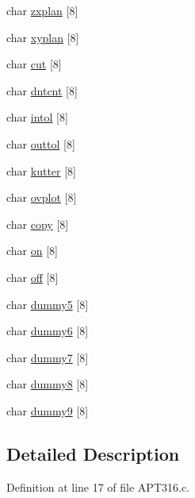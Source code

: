 \begin{DoxyCompactItemize}
char \hyperlink{structholrth__1___aa273c07356670f38ee715d3821a22849}{zxplan} \mbox{[}8\mbox{]}
\item 
char \hyperlink{structholrth__1___a73b0d426f18d0989aa84d7fdab552841}{xyplan} \mbox{[}8\mbox{]}
\item 
char \hyperlink{structholrth__1___a83821b1fc5d105782596df52958257c1}{cut} \mbox{[}8\mbox{]}
\item 
char \hyperlink{structholrth__1___a7f96017a5d84883bb5030d8890abf286}{dntcnt} \mbox{[}8\mbox{]}
\item 
char \hyperlink{structholrth__1___aa4af76563cee6e31925cdc86743662b4}{intol} \mbox{[}8\mbox{]}
\item 
char \hyperlink{structholrth__1___a85d609d0e370f6b88d98799bbdd894e9}{outtol} \mbox{[}8\mbox{]}
\item 
char \hyperlink{structholrth__1___a5ff73d9b6c847252e17e1ff8633b83a3}{kutter} \mbox{[}8\mbox{]}
\item 
char \hyperlink{structholrth__1___a466383973fe32f3731ca50cf4ece72e6}{ovplot} \mbox{[}8\mbox{]}
\item 
char \hyperlink{structholrth__1___ad3a33df9882828132af2cbd01838aaad}{copy} \mbox{[}8\mbox{]}
\item 
char \hyperlink{structholrth__1___a73eb82d2bea5a7eb20511c50a6c14225}{on} \mbox{[}8\mbox{]}
\item 
char \hyperlink{structholrth__1___aaf6a68c43c88c6eccb4733b4709ba1f7}{off} \mbox{[}8\mbox{]}
\item 
char \hyperlink{structholrth__1___a23ddfd00243eb067c603abd8d88df937}{dummy5} \mbox{[}8\mbox{]}
\item 
char \hyperlink{structholrth__1___a99cfcde1b7c84a7f0884dd61320d3646}{dummy6} \mbox{[}8\mbox{]}
\item 
char \hyperlink{structholrth__1___a7d5e3afaf4f6ee04b5778491cb34b4c4}{dummy7} \mbox{[}8\mbox{]}
\item 
char \hyperlink{structholrth__1___af324df3fbf30ca73f15a32e5ce8cb0d0}{dummy8} \mbox{[}8\mbox{]}
\item 
char \hyperlink{structholrth__1___a3d280f84a091f9b2327020ae093ad024}{dummy9} \mbox{[}8\mbox{]}
\end{DoxyCompactItemize}


\subsection{Detailed Description}


Definition at line 17 of file A\+P\+T316.\+c.




